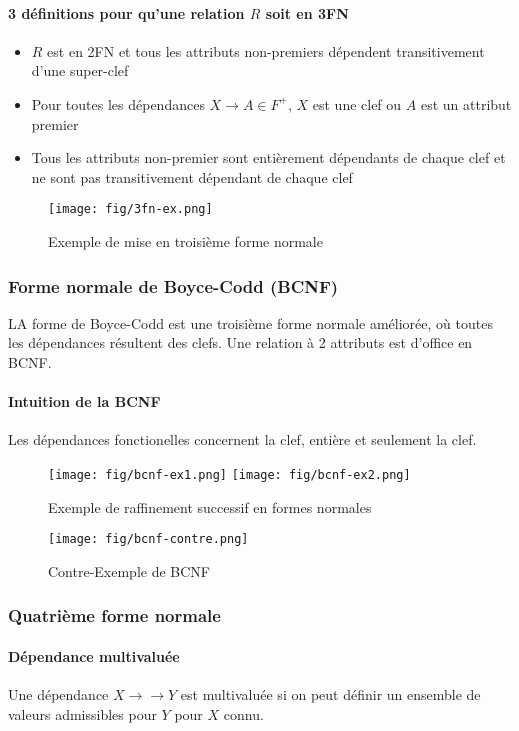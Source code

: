 \documentclass[a4paper]{article}
\begin{document}
\paragraph{3 définitions pour qu'une relation $R$ soit en 3FN}
\begin{itemize}
  \item $R$ est en 2FN et tous les attributs non-premiers dépendent transitivement d'une super-clef
  \item Pour toutes les dépendances $X \rightarrow A \in F^+$, $X$ est une clef ou $A$ est un attribut premier
  \item Tous les attributs non-premier sont entièrement dépendants de chaque clef
        et ne sont pas transitivement dépendant de chaque clef
\end{itemize}

\begin{figure}[H]
\center
\texttt{[image: fig/3fn-ex.png]}
\caption{Exemple de mise en troisième forme normale}
\end{figure}

\subsubsection{Forme normale de Boyce-Codd (BCNF)}
LA forme de Boyce-Codd est une troisième forme normale améliorée, où toutes les
dépendances résultent des clefs. Une relation à 2 attributs est d'office en
BCNF. 

\paragraph{Intuition de la BCNF} Les dépendances fonctionelles concernent la clef,
entière et seulement la clef.
\begin{figure}[H]
\center
\texttt{[image: fig/bcnf-ex1.png]}
\texttt{[image: fig/bcnf-ex2.png]}
\caption{Exemple de raffinement successif en formes normales}
\end{figure}

\begin{figure}[H]
\center
\texttt{[image: fig/bcnf-contre.png]}
\caption{Contre-Exemple de BCNF}
\end{figure}

\subsubsection{Quatrième forme normale}
\paragraph{Dépendance multivaluée} Une dépendance $X \rightarrow\rightarrow Y$
est multivaluée si on peut définir un ensemble de valeurs admissibles pour $Y$
pour $X$ connu.
\end{document}
